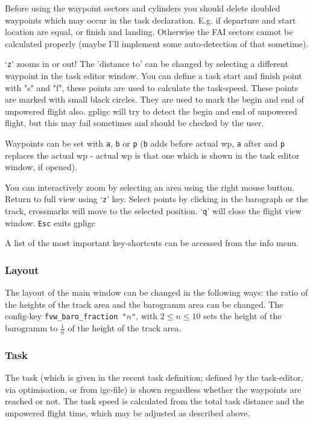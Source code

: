 Before using the waypoint sectors and cylinders you should delete doubled waypoints which may occur in the task declaration. E.g. if departure and start location are equal, or finish and landing.
Otherwise the FAI sectors cannot be calculated properly (maybe I'll implement some auto-detection of that sometime).

`\texttt{z}' zooms in or out!
The 'distance to' can be changed by selecting a different waypoint in the task editor window.
You can define a task start and finish point with "s" and "f", these points are
used to calculate the task-speed. These points are marked with small black circles.
They are used to mark the begin and end of unpowered flight also. 
gpligc will try to detect the begin and end of unpowered flight, but this may fail sometimes and should be checked by the user.

Waypoints can be set with \texttt{a}, \texttt{b} or \texttt{p} (\texttt{b} adds before actual wp, \texttt{a} after and \texttt{p}      
replaces the actual wp - actual wp is that one which is shown in the task editor window, if opened).
                                                                                             
You can interactively zoom by selecting an area using the right mouse button. Return to full view using `\texttt{z}' key.
Select points by clicking in the barograph or the track, crossmarks will move to the selected position.
`\texttt{q}' will close the flight view window.
\texttt{Esc} exits gpligc

A list of the most important key-shortcuts can be accessed from the info menu.

\subsubsection{Layout}
The layout of the main window can be changed in the following ways:
the ratio of the heights of the track area and the barogramm area can be changed.
The config-key \texttt{fvw\_baro\_fraction "$n$"}, with $2 \le n \le 10$ sets the height of the barogramm to $\frac{1}{n}$ of the height of the track area.


\subsubsection{Task}
The task (which is given in the recent task definition; defined by the task-editor, via optimisation, or from igc-file) is shown regardless whether the waypoints are reached or not.
The task speed is calculated from the total task distance and the unpowered flight time, which may be adjusted as described above.

